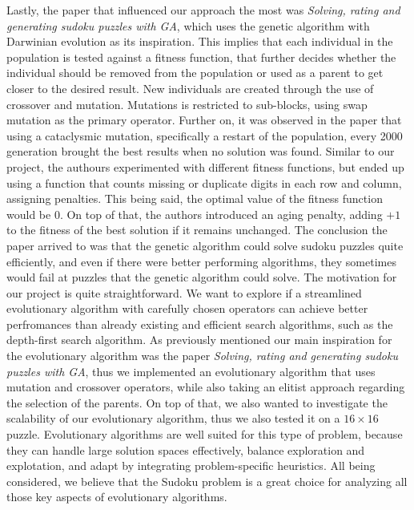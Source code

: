{\newline Lastly, the paper that influenced our approach the most was \textit{Solving, rating and generating sudoku puzzles with GA}, which uses the genetic algorithm with Darwinian evolution as its inspiration\cite{Mantere2007}. This implies that each individual in the population is tested against a fitness function, that further decides whether the individual should be removed from the population or used as a parent to get closer to the desired result.
New individuals are created through the use of crossover and mutation. Mutations is restricted to sub-blocks, using swap mutation as the primary operator. Further on, it was observed in the paper that using a cataclysmic mutation, specifically a restart of the population, every 2000 generation brought the best results when no solution was found. Similar to our project, the authours experimented with different fitness functions, but ended up using a function that counts missing or duplicate digits in each row and column, assigning penalties. This being said, the optimal value of the fitness function would be 0. On top of that, the authors introduced an aging penalty, adding $+1$ to the fitness of the best solution if it remains unchanged.
The conclusion the paper arrived to was that the genetic algorithm could solve sudoku puzzles quite efficiently, and even if there were better performing algorithms, they sometimes would fail at puzzles that the genetic algorithm could solve.}
{\newline}
{\newline The motivation for our project is quite straightforward. We want to explore if a streamlined evolutionary algorithm with carefully chosen operators can achieve better perfromances than already existing and efficient search algorithms, such as the depth-first search algorithm. As previously mentioned our main inspiration for the evolutionary algorithm was the paper \textit{Solving, rating and generating sudoku puzzles with GA}, thus we implemented an evolutionary algorithm that uses mutation and crossover operators, while also taking an elitist approach regarding the selection of the parents\cite{Mantere2007}.
On top of that, we also wanted to investigate the scalability of our evolutionary algorithm, thus we also tested it on a $16 \times 16$ puzzle. Evolutionary algorithms are well suited for this type of problem, because they can handle large solution spaces effectively, balance exploration and explotation, and adapt by integrating problem-specific heuristics.
All being considered, we believe that the Sudoku problem is a great choice for analyzing all those key aspects of evolutionary algorithms.}

